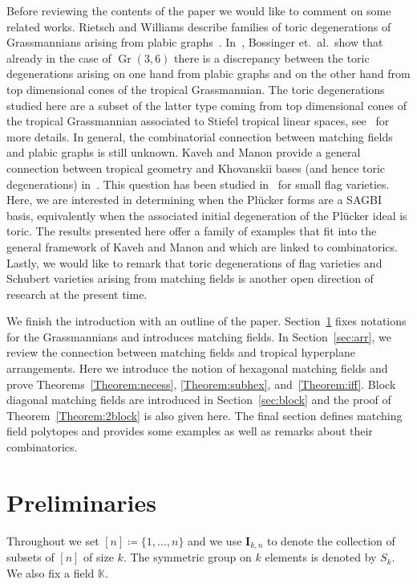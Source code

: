 \documentclass[ALCO,ThmDefs,Unicode,epreuves]{cedram}
\DeclareMathOperator{\Gr}{Gr}
\begin{document}
Before reviewing the contents of the paper we would like to comment on some related works. Rietsch and Williams describe families of toric degenerations of Grassmannians arising from plabic graphs~\cite{RietschWilliams}. In~\cite{Bossinger}, Bossinger et.~al.~show that already in the case of $\Gr(3, 6)$ there is a discrepancy between the toric degenerations arising on one hand from plabic graphs and on the other hand from top dimensional cones of the tropical Grassmannian. The toric degenerations studied here are a subset of the latter type coming from top dimensional cones of the tropical Grassmannian associated to Stiefel tropical linear spaces, see~\cite{fink2015stiefel} for more details. In general, the combinatorial connection between matching fields and plabic graphs is still unknown. 
Kaveh and Manon provide a general connection between tropical geometry and Khovanskii bases (and hence toric degenerations) in~\cite{Kaveh}. This question has been studied in~\cite{bossinger2017computing} for small flag varieties. Here, we are interested in determining when the Pl{\"u}cker forms are a SAGBI basis, equivalently when the associated initial degeneration of the Pl{\"u}cker ideal is toric. 
The results presented here offer a family of examples 
that fit into the general framework of Kaveh and Manon and which are linked to combinatorics. Lastly, we would like to remark that toric degenerations of flag varieties and Schubert varieties arising from matching fields is another open direction of research at the present time. 

\smallskip
We finish the introduction with an outline of the paper. Section~\ref{prelim} fixes notations for the Grassmannians and introduces matching fields. In Section~\ref{sec:arr}, we review the connection between matching fields and tropical hyperplane arrangements. Here we introduce the notion of hexagonal matching fields and prove Theorems~\ref{Theorem:necess}, \ref{Theorem:subhex}, and~\ref{Theorem:iff}. Block diagonal matching fields are introduced in Section~\ref{sec:block} and the proof of Theorem~\ref{Theorem:2block} is also given here. The final section defines matching field polytopes and provides some examples as well as remarks about their combinatorics. 

\section{Preliminaries}\label{prelim} 

Throughout we set $[n]\coloneqq \{1, \ldots , n\}$ and we use $\mathbf{I}_{k, n}$ to denote the collection of subsets of $[n]$ of size $k$. The symmetric group on $k$ elements is denoted by $S_k$. We also fix a field $\mathbb{K}$. 
\end{document}
